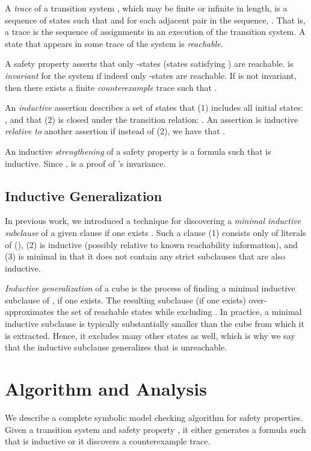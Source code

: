 \documentclass{llncs}
\begin{document}
A \emph{trace}  of a transition system , which
may be finite or infinite in length, is a sequence of states such that
 and for each adjacent pair  in the
sequence, .  That is, a trace is the
sequence of assignments in an execution of the transition system.  A
state that appears in some trace of the system is \emph{reachable}.

A safety property  asserts that only -states (states
satisfying ) are reachable.   is \emph{invariant} for the system
if indeed only -states are reachable.  If  is not invariant,
then there exists a finite \emph{counterexample} trace
 such that .

An \emph{inductive} assertion  describes a set of states that
(1) includes all initial states: , and that (2) is
closed under the transition relation: .  An
assertion  is inductive \emph{relative to} another assertion  if
instead of (2), we have that .

An inductive \emph{strengthening} of a safety property  is a
formula  such that  is inductive.  Since ,  is a proof of 's invariance.

\subsection{Inductive Generalization}
\label{subsec:ig}

In previous work, we introduced a technique for discovering a
\emph{minimal inductive subclause}  of a given clause  if one
exists \cite{Bradley+Manna/2007}.  Such a clause  (1) consists only
of literals of  (), (2) is inductive (possibly
relative to known reachability information), and (3) is minimal in
that it does not contain any strict subclauses that are also
inductive.

\emph{Inductive generalization} of a cube  is the process of
finding a minimal inductive subclause  of , if one exists.
The resulting subclause (if one exists) over-approximates the set of
reachable states while excluding .  In practice, a minimal
inductive subclause is typically substantially smaller than the cube
 from which it is extracted.  Hence, it excludes many other states
as well, which is why we say that the inductive subclause generalizes
that  is unreachable.

\section{Algorithm and Analysis}
\label{sec:main}

We describe a complete symbolic model checking algorithm for safety
properties.  Given a transition system  and safety
property , it either generates a formula  such that 
is inductive or it discovers a counterexample trace.
\end{document}

